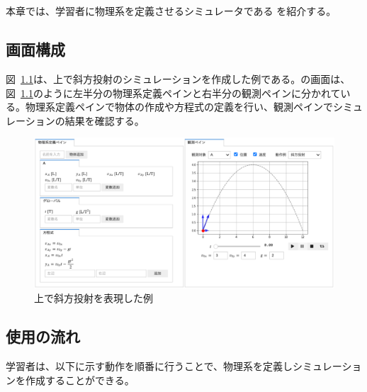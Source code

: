 \chapter{\simname} \label{idea}

本章では、学習者に物理系を定義させるシミュレータである \simname を紹介する。

\section{画面構成}

図~\ref{simsym_fig1}は、\simname 上で斜方投射のシミュレーションを作成した例である。\simname の画面は、図~\ref{simsym_fig1}のように左半分の物理系定義ペインと右半分の観測ペインに分かれている。物理系定義ペインで物体の作成や方程式の定義を行い、観測ペインでシミュレーションの結果を確認する。

\begin{figure}[bht]
  \centering
  \includegraphics*[width=\linewidth]{work/simsym_example-crop.pdf}
  \caption{\simname 上で斜方投射を表現した例} \label{simsym_fig1}
\end{figure}

\section{使用の流れ}
学習者は、以下に示す動作を順番に行うことで、物理系を定義しシミュレーションを作成することができる。


